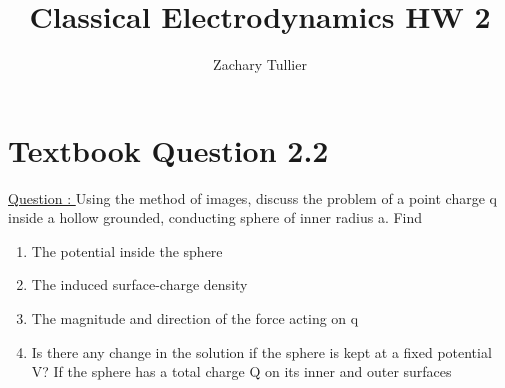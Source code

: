 \documentclass[12pt]{article}
\begin{document}
\singlespacing  %
\title{Classical Electrodynamics HW 2}

\author[1]{Zachary Tullier}

\maketitle


\section{Textbook Question 2.2} \label{section1}
    \underline{Question : }
    \newline Using the method of images, discuss the problem of a point charge q inside a hollow grounded, conducting sphere of inner radius a. Find
    \begin{enumerate}
        \item [a)] The potential inside the sphere
        \item [b)] The induced surface-charge density
        \item [c)] The magnitude and direction of the force acting on q
        \item [d)] Is there any change in the solution if the sphere is kept at a fixed potential V? If the sphere has a total charge Q on its inner and outer surfaces
    \end{enumerate}
\end{document}
